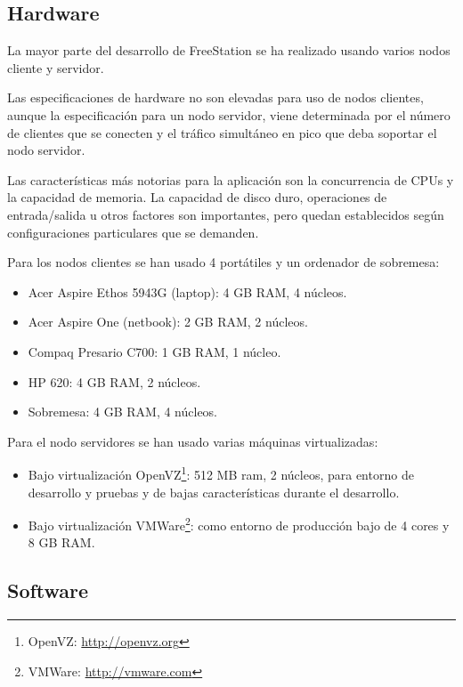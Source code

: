 \newpage

\subsection{Hardware}
\label{sec:harware}
La mayor parte del desarrollo de FreeStation se ha realizado usando varios nodos
cliente y servidor.

Las especificaciones de hardware no son elevadas para uso de nodos clientes,
aunque la especificación para un nodo servidor, viene determinada por el número
de clientes que se conecten y el tráfico simultáneo en pico que deba soportar el
nodo servidor.

Las características más notorias para la aplicación son la concurrencia de CPUs
y la capacidad de memoria. La capacidad de disco duro, operaciones de
entrada/salida u otros factores son importantes, pero quedan establecidos según
configuraciones particulares que se demanden.

Para los nodos clientes se han usado 4 portátiles y un ordenador de sobremesa:

\begin{itemize}
\item Acer Aspire Ethos 5943G (laptop): 4 GB RAM, 4 núcleos.
\item Acer Aspire One (netbook): 2 GB RAM, 2 núcleos.
\item Compaq Presario C700: 1 GB RAM, 1 núcleo.
\item HP 620: 4 GB RAM, 2 núcleos.
\item Sobremesa: 4 GB RAM, 4 núcleos.
\end{itemize}

Para el nodo servidores se han usado varias máquinas virtualizadas:

\begin{itemize}

\item Bajo virtualización OpenVZ\footnote{OpenVZ:
\url{http://openvz.org}\label{ftn:OpenVZ}}:
512 MB ram, 2 núcleos, para entorno de desarrollo y pruebas y de bajas características durante el desarrollo.

\item Bajo virtualización VMWare\footnote{VMWare:
\url{http://vmware.com}\label{ftn:VMWARE}}:
como entorno de producción bajo de 4 cores y 8 GB RAM.

\end{itemize}

\subsection{Software}

